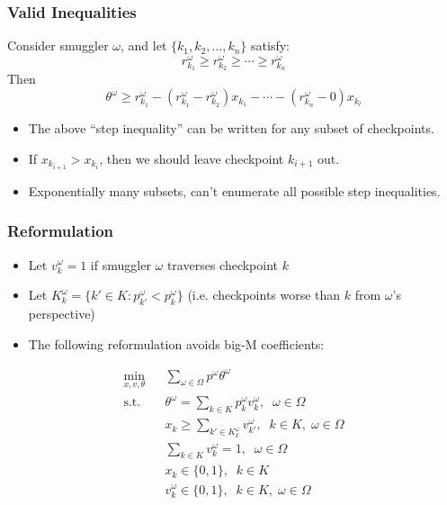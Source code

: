 \documentclass[12pt,handout]{beamer}
\begin{document}
\begin{frame}
\frametitle{Valid Inequalities}
Consider smuggler $\omega$, and let $\{k_1, k_2, \ldots, k_n\}$ satisfy:
\begin{equation}
r_{k_1}^\omega \ge r_{k_2}^\omega \ge \cdots \ge r_{k_n}^\omega \nonumber
\end{equation}
Then
\begin{equation}
\theta^\omega \ge r_{k_1}^\omega - (r_{k_1}^\omega - r_{k_2}^\omega) x_{k_1} - \cdots - (r_{k_n}^\omega - 0) x_{k_l} \nonumber
\end{equation}
\begin{itemize}
\item The above ``step inequality'' can be written for any subset of checkpoints.
\item If $x_{k_{i+1}} > x_{k_i}$, then we should leave checkpoint $k_{i+1}$ out.
\item Exponentially many subsets, can't enumerate all possible step inequalities.
\end{itemize}
\end{frame}

\begin{frame}
\frametitle{Reformulation}
\begin{itemize}
\item Let $v_k^\omega = 1$ if smuggler $\omega$ traverses checkpoint $k$
\item Let $K_k^\omega = \{k' \in K : p_{k'}^\omega < p_k^\omega\}$ (i.e. checkpoints worse than $k$ from $\omega$'s perspective)
\item The following reformulation avoids big-M coefficients:
\end{itemize}
\begin{eqnarray}
\min_{x,v,\theta} && \sum_{\omega \in \Omega} p^\omega \theta^\omega \nonumber \\
\mbox{s.t.} && \theta^\omega = \sum_{k \in K} p_k^\omega v_k^\omega,\;\;\omega \in \Omega \nonumber \\
&& x_k \ge \sum_{k' \in K_k^\omega} v_{k'}^\omega,\;\;k \in K,\;\omega \in \Omega \nonumber \\
&& \sum_{k \in K} v_k^\omega = 1,\;\;\omega \in \Omega \nonumber \\
&& x_k \in \{0,1\},\;\;k \in K \nonumber \\
&& v_k^\omega \in \{0,1\},\;\;k \in K,\;\omega \in \Omega \nonumber
\end{eqnarray}
\end{frame}
\end{document}

